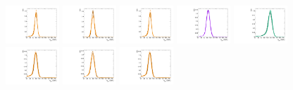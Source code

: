 \begin{figure}[htbp]
  \centering
  \includegraphics[width=0.18\textwidth]{fig/2Dfit/templateSignalVsMX_fromDC_GbuToWW_MJJ_mu_HP_bb_HDy.pdf}
  \includegraphics[width=0.18\textwidth]{fig/2Dfit/templateSignalVsMX_fromDC_RadToWW_MJJ_mu_HP_bb_HDy.pdf}
  \includegraphics[width=0.18\textwidth]{fig/2Dfit/templateSignalVsMX_fromDC_ZprToWW_MJJ_mu_HP_bb_HDy.pdf}
  \includegraphics[width=0.18\textwidth]{fig/2Dfit/templateSignalVsMX_fromDC_WprToWZ_MJJ_mu_HP_bb_HDy.pdf}
  \includegraphics[width=0.18\textwidth]{fig/2Dfit/templateSignalVsMX_fromDC_WprToWH_MJJ_mu_HP_bb_HDy.pdf}\\
  \includegraphics[width=0.18\textwidth]{fig/2Dfit/templateSignalVsMX_fromDC_GbuToWW_MJJ_mu_LP_bb_HDy.pdf}
  \includegraphics[width=0.18\textwidth]{fig/2Dfit/templateSignalVsMX_fromDC_RadToWW_MJJ_mu_LP_bb_HDy.pdf}
  \includegraphics[width=0.18\textwidth]{fig/2Dfit/templateSignalVsMX_fromDC_ZprToWW_MJJ_mu_LP_bb_HDy.pdf}

\end{figure}
